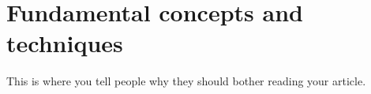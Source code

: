\section{Fundamental concepts and techniques}
This is where you tell people why they should bother reading your article.